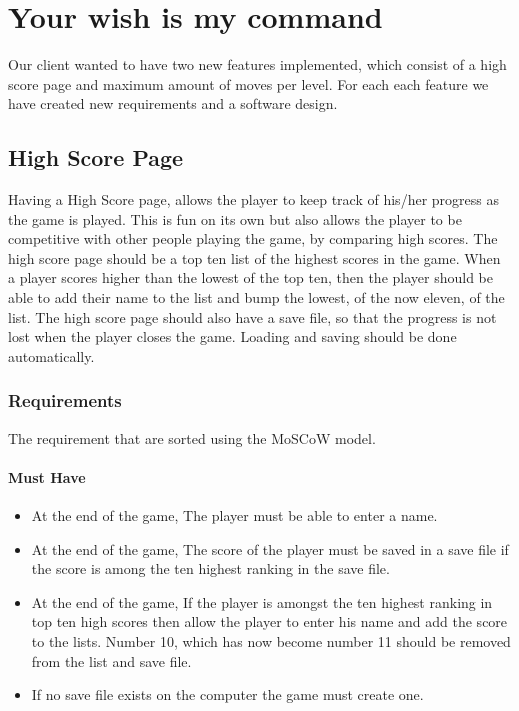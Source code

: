 \documentclass{article}
\begin{document}
\newpage
\section{Your wish is my command}
Our client wanted to have two new features implemented, which consist of a high score page and maximum amount of moves per level. For each each feature we have created new requirements and a software design.

\subsection{High Score Page} 
Having a High Score page, allows the player to keep track of his/her progress as the game is played. This is fun on its own but also allows the player to be competitive with other people playing the game, by comparing high scores. The high score page should be a top ten list of the highest scores in the game. When a player scores higher than the lowest of the top ten, then the player should be able to add their name to the list and bump the lowest, of the now eleven, of the list. The high score page should also have a save file, so that the progress is not lost when the player closes the game. Loading and saving should be done automatically.

\subsubsection{Requirements}
The requirement that are sorted using the MoSCoW model.

\paragraph{Must Have}
\begin{itemize}
\item At the end of the game, The player must be able to enter a name.

\item At the end of the game, The score of the player must be saved in a save file if the score is among the ten highest ranking in the save file.

\item At the end of the game, If the player is amongst the ten highest ranking in top ten high scores then allow the player to enter his name and add the score to the lists. Number 10, which has now become number 11 should be removed from the list and save file.

\item If no save file exists on the computer the game must create one.
\end{itemize}
\end{document}
